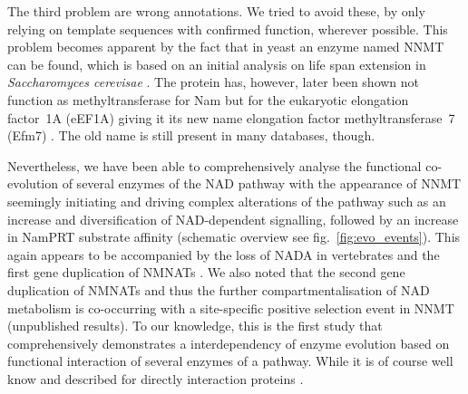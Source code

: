 The third problem are wrong annotations. We tried to avoid these, by only relying on template sequences with confirmed function, wherever possible. This problem becomes apparent by the fact that in yeast an enzyme named NNMT can be found, which is based on an initial analysis on life span extension in \textit{Saccharomyces cerevisae} \cite{Anderson2003}. The protein has, however, later been shown not function as methyltransferase for Nam but for the eukaryotic elongation factor~1A (eEF1A) giving it its new name elongation factor methyltransferase~7 (Efm7) \cite{Hamey2016}. The old name is still present in many databases, though.

Nevertheless, we have been able to comprehensively analyse the functional co-evolution of several enzymes of the NAD pathway with the appearance of NNMT seemingly initiating and driving complex alterations of the pathway such as an increase and diversification of NAD-dependent signalling, followed by an increase in NamPRT substrate affinity (schematic overview see fig.~\ref{fig:evo_events}). This again appears to be accompanied by the loss of NADA in vertebrates and the first gene duplication of NMNATs \cite{Lau2010}. We also noted that the second gene duplication of NMNATs and thus the further compartmentalisation of NAD metabolism is co-occurring with a site-specific positive selection event in NNMT (unpublished results). To our knowledge, this is the first study that comprehensively demonstrates a interdependency of enzyme evolution based on functional interaction of several enzymes of a pathway. While it is of course well know and described for directly interaction proteins .
